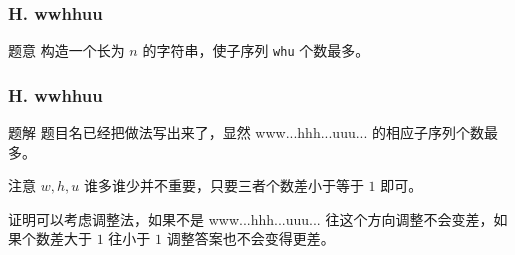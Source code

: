 \renewcommand{\problemname}{H. wwhhuu}

\begin{frame}\frametitle{\problemname}
	\begin{block}{题意}
		构造一个长为 $n$ 的字符串，使子序列 \texttt{whu} 个数最多。
	\end{block}
\end{frame}

\begin{frame}\frametitle{\problemname}
	\begin{block}{题解}
		题目名已经把做法写出来了，显然 www...hhh...uuu... 的相应子序列个数最多。

		注意 $w,h,u$ 谁多谁少并不重要，只要三者个数差小于等于 $1$ 即可。
		
		证明可以考虑调整法，如果不是 www...hhh...uuu... 往这个方向调整不会变差，如果个数差大于 $1$ 往小于 $1$ 调整答案也不会变得更差。
	\end{block}
\end{frame}